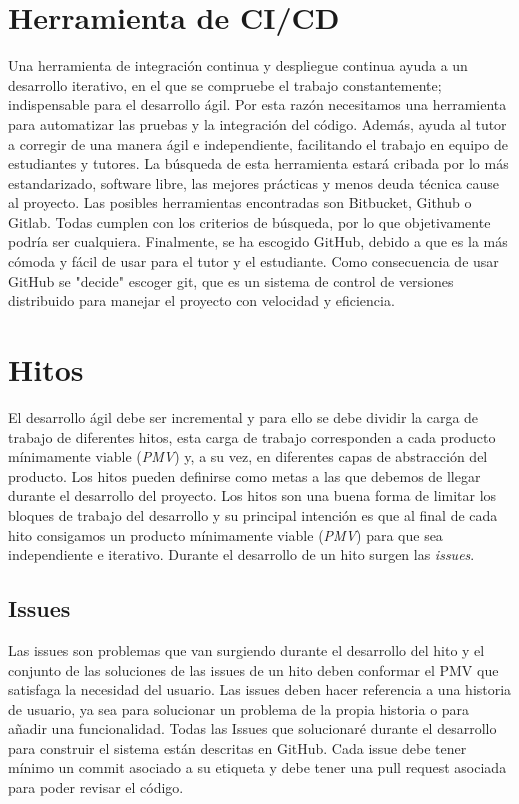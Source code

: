 

\section{Herramienta de CI/CD}
Una herramienta de integración continua y despliegue continua ayuda a un desarrollo iterativo, en el que se compruebe el trabajo constantemente; indispensable para el desarrollo ágil.
Por esta razón necesitamos una herramienta para automatizar las pruebas y la integración del código. Además, ayuda al tutor a corregir de una manera ágil e independiente, facilitando el trabajo en equipo de estudiantes y tutores.
La búsqueda de esta herramienta estará cribada por lo más estandarizado, software libre, las mejores prácticas y menos deuda técnica cause al proyecto.
Las posibles herramientas encontradas son Bitbucket, Github o Gitlab. Todas cumplen con los criterios de búsqueda, por lo que objetivamente podría ser cualquiera.
Finalmente, se ha escogido GitHub, debido a que es la más cómoda y fácil de usar para el tutor y el estudiante.
Como consecuencia de usar GitHub se "decide" escoger git, que es un sistema de control de versiones distribuido para manejar el proyecto con velocidad y eficiencia.

\section{Hitos}
\label{sec:hitos}
El desarrollo ágil debe ser incremental y para ello se debe dividir la carga de trabajo de diferentes hitos, esta carga
de trabajo corresponden a cada producto mínimamente viable (\textit{PMV}) y, a su vez, en diferentes capas de abstracción del producto.
Los hitos pueden definirse como metas a las que debemos de llegar durante el desarrollo del proyecto.
Los hitos son una buena forma de limitar los bloques de trabajo del desarrollo y su principal intención es que
al final de cada hito consigamos un producto mínimamente viable (\textit{PMV}) para que sea independiente e iterativo.
Durante el desarrollo de un hito surgen las \textit{issues}.

\subsection{Issues}
Las issues son problemas que van surgiendo durante el desarrollo del hito y
el conjunto de las soluciones de las issues de un hito deben conformar el PMV que satisfaga la necesidad del usuario.
Las issues deben hacer referencia a una historia de usuario, ya sea para solucionar un problema de la propia historia o para añadir una funcionalidad.
Todas las Issues que solucionaré durante el desarrollo para construir el sistema están descritas en GitHub. Cada issue debe tener mínimo un commit asociado a su
etiqueta y debe tener una pull request asociada para poder revisar el código.

